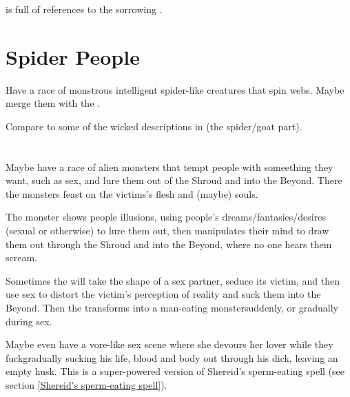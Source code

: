 \WanderersInDarknessEmph is full of references to the sorrowing \nymphs. 
















\section{Spider People}
Have a race of monstrous intelligent spider-like creatures that spin webs. 
Maybe merge them with the . 

Compare to some of the wicked descriptions in \cite{Cracked:GeneticExperiments} (the spider/goat part). 
















\section{\Succubus}
\index{\succubus}
Maybe have a race of alien monsters that tempt people with someething they want, such as sex, and lure them out of the Shroud and into the Beyond. 
There the monsters feast on the victims's flesh and (maybe) souls. 

The monster shows people illusions, using people's dreams/fantasies/desires (sexual or otherwise) to lure them out, then manipulates their mind to draw them out through the Shroud and into the Beyond, where no one hears them scream.

Sometimes the \succubus{} will take the shape of a sex partner, seduce its victim, and then use sex to distort the victim's perception of reality and suck them into the Beyond. Then the \succubus{} transforms into a man-eating monster\dash suddenly, or gradually during sex. 

Maybe even have a vore-like sex scene where she devours her lover while they fuck\dash gradually sucking his life, blood and body out through his dick, leaving an empty husk. This is a super-powered version of Shereid's sperm-eating spell (see section \ref{Shereid's sperm-eating spell}).

